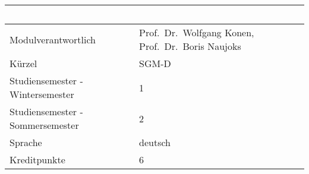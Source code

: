 \begin{longtable}[]{@{}ll@{}}
\toprule
\begin{minipage}[b]{0.12\columnwidth}\raggedright\strut
~\strut
\end{minipage} & \begin{minipage}[b]{0.12\columnwidth}\raggedright\strut
~\strut
\end{minipage}\tabularnewline
\midrule
\endhead
\begin{minipage}[t]{0.12\columnwidth}\raggedright\strut
Modulverantwortlich\strut
\end{minipage} & \begin{minipage}[t]{0.12\columnwidth}\raggedright\strut
Prof.~Dr.~Wolfgang Konen, Prof.~Dr.~Boris Naujoks\strut
\end{minipage}\tabularnewline
\begin{minipage}[t]{0.12\columnwidth}\raggedright\strut
Kürzel\strut
\end{minipage} & \begin{minipage}[t]{0.12\columnwidth}\raggedright\strut
SGM-D\strut
\end{minipage}\tabularnewline
\begin{minipage}[t]{0.12\columnwidth}\raggedright\strut
Studiensemester - Wintersemester\strut
\end{minipage} & \begin{minipage}[t]{0.12\columnwidth}\raggedright\strut
1\strut
\end{minipage}\tabularnewline
\begin{minipage}[t]{0.12\columnwidth}\raggedright\strut
Studiensemester - Sommersemester\strut
\end{minipage} & \begin{minipage}[t]{0.12\columnwidth}\raggedright\strut
2\strut
\end{minipage}\tabularnewline
\begin{minipage}[t]{0.12\columnwidth}\raggedright\strut
Sprache\strut
\end{minipage} & \begin{minipage}[t]{0.12\columnwidth}\raggedright\strut
deutsch\strut
\end{minipage}\tabularnewline
\begin{minipage}[t]{0.12\columnwidth}\raggedright\strut
Kreditpunkte\strut
\end{minipage} & \begin{minipage}[t]{0.12\columnwidth}\raggedright\strut
6\strut
\end{minipage}\tabularnewline

\end{longtable}
